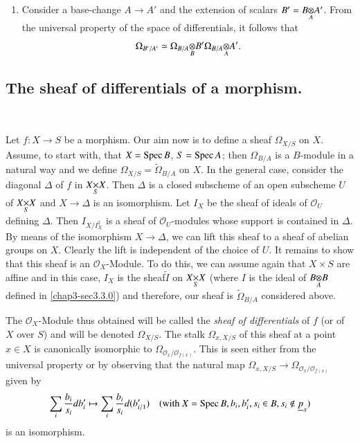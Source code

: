 \begin{enumerate}
\item Consider a base-change $A\to A'$ and the extension of scalars
  $B'=\foprod{B}{A'}{A}$. From the universal property of the space of
  differentials, it follows that
$$
\Omega_{B'/A'}\simeq
\foprod{\Omega_{B/A}}{B'}{B}\foprod{\Omega_{B/A}}{A'}{A}. 
$$
\end{enumerate}

\subsection{The sheaf of differentials of a
  morphism.}\label{chap3-sec3.3.1}

~

Let $f:X\to S$ be a morphism. Our aim now is to define a sheaf
$\Omega_{X/S}$ on $X$. Assume, to start with, that $X=\operatorname{Spec} B$,
$S=\operatorname{Spec} A$; then $\Omega_{B/A}$ is a $B$-module in a natural way and
we define $\Omega_{X/S}=\widetilde{\Omega}_{B/A}$ on $X$. In the
general case, consider the diagonal $\Delta$ of $f$ in
$\fprod{X}{X}{S}$. Then $\Delta$ is a closed subscheme of an open
subscheme $U$ of $\fprod{X}{X}{S}$ and $X\to \Delta$ is an
isomorphism. Let $I_{X}$ be the sheaf of ideals of $\mathscr{O}_{U}$
defining $\Delta$. Then $I_{X/I^{2}_{X}}$ is a sheaf of
$\mathscr{O}_{U}$-modules whose support is contained in $\Delta$. By
means of the isomorphism $X\to \Delta$, we can lift this sheaf to a
sheaf of abelian groups on $X$. Clearly the lift is independent of the
choice of $U$. It remains to show that this sheaf is an
$\mathscr{O}_{X}$-Module. To do this, we can assume again that
$X\times S$ are affine and in this case, $I_{X}$ is the
sheaf\pageoriginale $\widetilde{I}$ on $\fprod{X}{X}{S}$ (where $I$ is
the ideal of $\foprod{B}{B}{A}$ defined in \ref{chap3-sec3.3.0}) and
therefore, our sheaf is $\widetilde{\Omega}_{B/A}$ considered above.

The $\mathscr{O}_{X}$-Module thus obtained will be called the {\em
  sheaf of differentials} of $f$ (or of $X$ over $S$) and will be
denoted $\Omega_{X/S}$. The stalk $\Omega_{x,X/S}$ of this sheaf at a
point $x\in X$ is canonically isomorphic to
$\Omega_{\mathscr{O}_{x}/\mathscr{O}_{f(x)}}$. This is seen either
from the universal property or by observing that the natural map
$\Omega_{x,X/S}\to \Omega_{\mathscr{O}_{x}/\mathscr{O}_{f(x)}}$ given
by
$$
\sum_{i}\frac{b_{i}}{s_{i}}db'_{i}\mapsto
\sum_{i}\frac{b_{i}}{s_{i}}d(b'_{i/1})\quad (\text{with } X=\operatorname{Spec}
B,b_{i},b'_{i},s_{i}\in B, s_{i}\not\in \underline{p}_{x}) 
$$
is an isomorphism.

